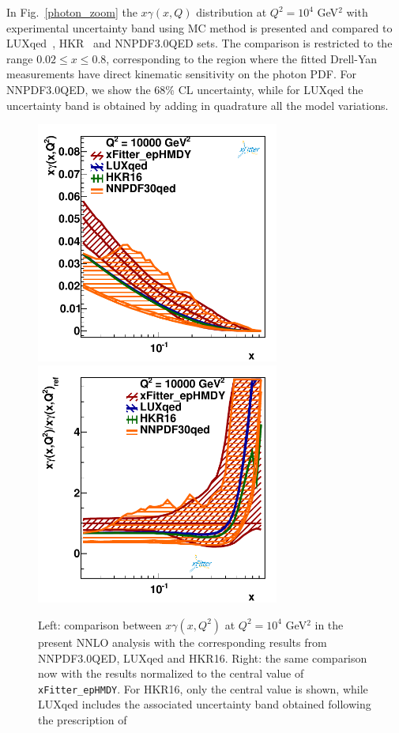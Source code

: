 In Fig.~\ref{photon_zoom} the $x\gamma(x,Q)$ distribution at
$Q^2=10^4$ GeV$^2$ with experimental uncertainty band using MC method is presented and compared to LUXqed~\cite{Manohar:2016nzj},
HKR~\cite{Harland-Lang:2016apc} and NNPDF3.0QED sets.
%
The comparison is restricted to the range $0.02 \le x \le 0.8$,
corresponding to the region where the fitted Drell-Yan measurements
have direct kinematic sensitivity on the photon PDF.
%
For NNPDF3.0QED, we show the 68\% CL uncertainty, while for LUXqed the
uncertainty band is obtained by adding in quadrature all the model
variations.

\begin{figure}[t]
  \includegraphics[width=8cm]{figs/photon_comp_10000.pdf}
  \includegraphics[width=8cm]{figs/photon_comp_10000_ratio.pdf} 
\caption{Left: comparison between $x\gamma(x,Q^2)$ at $Q^2=10^4$ GeV$^2$ in the present
  NNLO analysis with the corresponding results from NNPDF3.0QED, LUXqed and HKR16.
  Right: the same comparison now with the results normalized to the central value
  of {\tt xFitter\_epHMDY}.
  For HKR16, only the central value is shown, while LUXqed includes
  the associated uncertainty band obtained following the prescription
  of~\cite{Manohar:2016nzj} }
\label{photon_zoom} \label{photon_zoom_ratio}
\end{figure}

